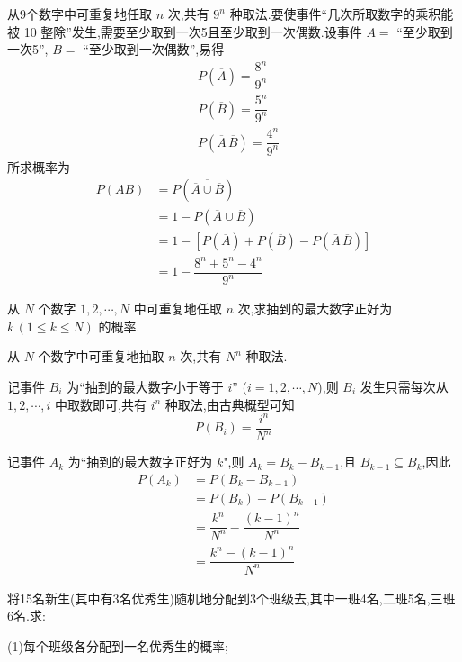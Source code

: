 \begin{solution}
    从9个数字中可重复地任取 $n$ 次,共有 $9^n$ 种取法.要使事件``几次所取数字的乘积能被 10 整除''发生,需要至少取到一次5且至少取到一次偶数.设事件 $A=$ ``至少取到一次5'', $B=$ ``至少取到一次偶数'',易得
    $$
    \begin{aligned}
        & P(\overline{A}) = \dfrac{8^n}{9^n} \\
        & P(\overline{B}) = \dfrac{5^n}{9^n} \\
        & P(\overline{A} \, \overline{B}) = \dfrac{4^n}{9^n}
    \end{aligned}
    $$
    所求概率为
    $$
    \begin{aligned}
        P(AB) &= P(\overline{\overline{A} \cup \overline{B}}) \\
        &= 1 - P(\overline{A} \cup \overline{B}) \\
        &= 1 - [P(\overline{A}) + P(\overline{B}) - P(\overline{A} \, \overline{B})] \\
        &= 1 - \dfrac{8^n + 5^n - 4^n}{9^n}
    \end{aligned}
    $$
\end{solution}

\question 从 $N$ 个数字 $1,2,\cdots,N$ 中可重复地任取 $n$ 次,求抽到的最大数字正好为 $k \, (1 \leqslant k \leqslant N)$ 的概率.

\begin{solution}
    从 $N$ 个数字中可重复地抽取 $n$ 次,共有 $N^n$ 种取法.

    记事件 $B_i$ 为``抽到的最大数字小于等于 $i$'' ($i=1,2,\cdots,N$),则 $B_i$ 发生只需每次从 $1,2,\cdots,i$ 中取数即可,共有 $i^n$ 种取法,由古典概型可知
    $$
    P(B_i) = \dfrac{i^n}{N^n}
    $$

    记事件 $A_k$ 为``抽到的最大数字正好为 $k$",则 $A_k = B_k - B_{k-1}$,且 $B_{k-1} \subseteq B_k$,因此
    $$
    \begin{aligned}
        P(A_k) &= P(B_k - B_{k-1}) \\
        &= P(B_k) - P(B_{k-1}) \\
        &= \dfrac{k^n}{N^n} - \dfrac{(k-1)^n}{N^n} \\
        &= \dfrac{k^n - (k-1)^n}{N^n}
    \end{aligned}
    $$
\end{solution}

\question 将15名新生(其中有3名优秀生)随机地分配到3个班级去,其中一班4名,二班5名,三班6名.求:

(1)每个班级各分配到一名优秀生的概率;

